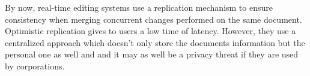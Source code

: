 By now, real-time editing systems use a replication mechanism to ensure consistency when merging concurrent changes performed on the same document. Optimistic replication gives to users a low time of latency. However, they use a centralized approach which doesn’t only store the documents information but the personal one as well and  and it may as well be a privacy threat if they are used by corporations. 